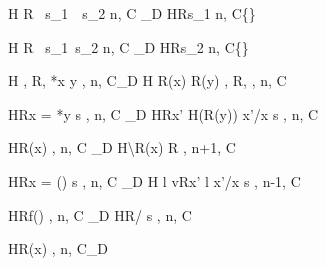 \begin{figure}
\begin{minipage}{\textwidth}
\vspace{2mm}

{\langle H \coma R \coma \IFNULL\Sirx \ \THEN   s_{1}\ \ELSE\  s_{2} \coma  n, C \rangle
  \rightarrow_{D}
  \langle H\coma R\coma s_{1} \coma n, C\cup \{\sassx\} \rangle}

\vspace{2mm}

{\langle H \coma R \coma \IFNULL\Sirx\ \THEN  s_{1}\ \ELSE  s_{2} \coma  n, C\rangle
  \rightarrow_{D}
  \langle H\coma R\coma s_{2} \coma  n, C\cup \{\sassxn\} \rangle}

\vspace{2mm}

{ \langle H , R, *x \leftarrow y , n, C\rangle \xlongrightarrow{}_{D}
  \langle H \Lfc R(x) \mapsto R(y) \Rfc , R, \SKIP , n, C \rangle }

\vspace{2mm}

{\langle H\coma R\coma  \LET x = *y \; \IN s , n, C \rangle
  \longrightarrow_{D}
  \langle H\coma R\Lfc x' \mapsto H(R(y)) \Rfc \coma   \Lb x'/x \Rb s , n, C\rangle }

\vspace{2mm}

{\langle H\coma R\coma \Free(x) , n, C \rangle \xlongrightarrow{\Free}_{D}
  \langle H\backslash R(x) \coma R \coma \SKIP , n+1, C \rangle}

\vspace{2mm}

{\langle H\coma R\coma  \LET x = \Malloc() \; \IN s , n, C\rangle
  \xlongrightarrow{\Malloc}_{D}
  \langle H \Lfc l \mapsto v\Rfc \coma R\Lfc x' \mapsto l \Rfc \coma   \Lb x'/x \Rb s , n-1, C  \rangle }

\vspace{2mm}
\begin{minipage}{0.5\textwidth}
{ \langle H\coma R\coma  f() , n, C\rangle
  \longrightarrow_{D}
  \langle H\coma R\coma  \Lb {}/ \Rb s , n, C \rangle}
\end{minipage}
\begin{minipage}{0.5\textwidth}
{\langle H\coma R\coma \Free(x) , n, C\rangle \xlongrightarrow{\Free}_{D} \MEMEX}
\end{minipage}
\vspace{2mm}


\end{minipage}
\end{figure}
